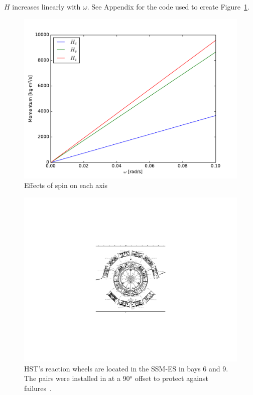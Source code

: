 \documentclass[onecolumn,10pt]{jhwhw}
\begin{document}

$H$ increases linearly with $\omega$. See Appendix for the code used to create Figure~\ref{fig:spin}.

\begin{figure}[h!]
\begin{center}
\includegraphics[height=0.41\textheight]{figure2.pdf}
\end{center}
\caption{Effects of spin on each axis}
\label{fig:spin}
\end{figure}


\begin{figure}[h!]
\begin{center}
\includegraphics[height=0.5\textheight]{hst_rw.pdf}
\end{center}
\caption{HST's reaction wheels are located in the SSM-ES in bays 6 and 9. The pairs were installed in at a 90$^o$ offset to protect against failures~\cite{hst}.}
\label{fig:rw}
\end{figure}
\end{document}
